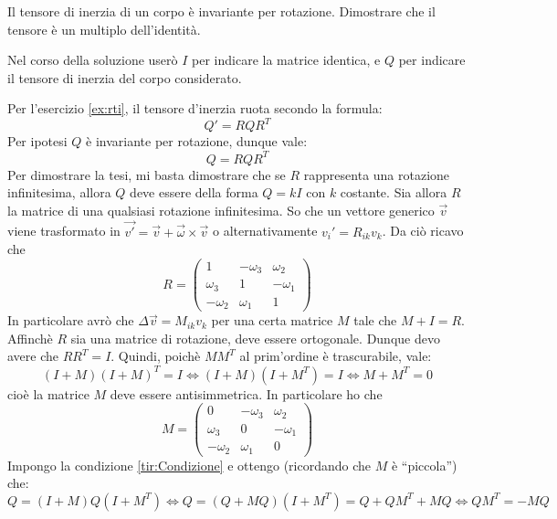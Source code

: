 \documentclass[../main.tex]{subfiles}
\begin{document}

\textex
Il tensore di inerzia di un corpo è invariante per rotazione. Dimostrare che il tensore è un multiplo dell'identità.

\solution
Nel corso della soluzione userò $I$ per indicare la matrice identica, e $Q$ per indicare il tensore di inerzia del corpo considerato.

Per l'esercizio \cref{ex:rti}, il tensore d'inerzia ruota secondo la formula:
\begin{equation}
 Q' = RQR^T
\end{equation}
Per ipotesi $Q$ è invariante per rotazione, dunque vale:
\begin{equation}\label{tir:Condizione}
 Q = RQR^T
\end{equation}
Per dimostrare la tesi, mi basta dimostrare che se $R$ rappresenta una rotazione infinitesima, allora $Q$ deve essere della forma $Q=kI$ con $k$ costante.
Sia allora $R$ la matrice di una qualsiasi rotazione infinitesima. So che un vettore generico $\overrightarrow v$ viene trasformato in 
$ \overrightarrow{v'} = \overrightarrow v + \overrightarrow\omega \times \overrightarrow v $ o alternativamente  ${v_i}' = R_{ik}v_k$. Da ciò ricavo che
$$ R =
\begin{pmatrix}
 1 & -\omega_3 & \omega_2 \\
 \omega_3 & 1 & -\omega_1 \\
 -\omega_2 & \omega_1 & 1
\end{pmatrix}
$$
In particolare avrò che $\Delta \overrightarrow v = M_{ik}v_k$ per una certa matrice $M$ tale che $M+I=R$.
Affinchè $R$ sia una matrice di rotazione, deve essere ortogonale. Dunque devo avere che $RR^T=I$. Quindi, poichè $MM^T$ al prim'ordine è trascurabile, vale:
\begin{equation}
 (I+M)(I+M)^T = I \Leftrightarrow (I+M)(I+M^T)=I \Leftrightarrow M+M^T = 0
\end{equation}
cioè la matrice $M$ deve essere antisimmetrica. In particolare ho che 
$$ M =
\begin{pmatrix}
 0 & -\omega_3 & \omega_2 \\
 \omega_3 & 0 & -\omega_1 \\
 -\omega_2 & \omega_1 & 0
\end{pmatrix}
$$
Impongo la condizione \cref{tir:Condizione} e ottengo (ricordando che $M$ è ``piccola'') che:
\begin{equation}
  Q=(I+M)Q(I+M^T) \Leftrightarrow Q=(Q+MQ)(I+M^T)=Q+QM^T+MQ\Leftrightarrow QM^T=-MQ
\end{equation}
\end{document}
